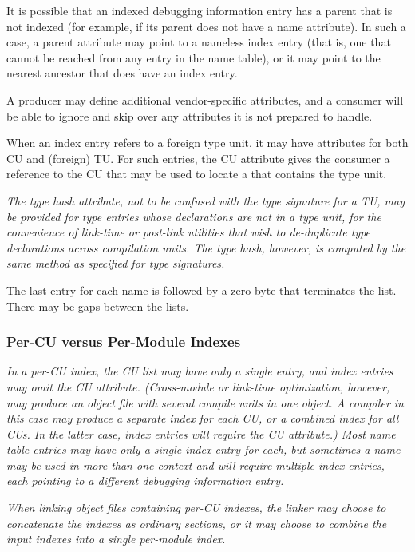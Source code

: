It is possible that an indexed debugging information entry
has a parent that is not
indexed (for example, if its parent does not have a name attribute). 
In such a case, a parent attribute may point to a nameless index
entry (that is, one that cannot be reached from any entry in the
name table), or it may point to the nearest ancestor that does
have an index entry.

A producer may define additional vendor-specific attributes, 
and a consumer will be able to ignore and skip over any attributes 
it is not prepared to handle.

When an index entry refers to a foreign type unit, it may have
attributes for both CU and (foreign) TU. For such entries, the CU
attribute gives the consumer a reference to the CU that may be used to
locate a \splitDWARFobjectfile{} that contains the type unit.

\textit{The type hash attribute, not to be confused with the type signature
for a TU, may be provided for type entries whose declarations are not
in a type unit, for the convenience of link-time or post-link
utilities that wish to de-duplicate type declarations across
compilation units. The type hash, however, is computed by the
same method as specified for type signatures.}

The last entry for each name is followed by a zero byte that
terminates the list. There may be gaps between the lists.

\subsubsection{Per-CU versus Per-Module Indexes}
\label{chap:percuvspermoduleindexes}
\textit{In a per-CU index, the CU list may have only a single entry, 
and index entries may omit the CU attribute. (Cross-module or link-time
optimization, however, may produce an object file with several compile
units in one object. A compiler in this case may produce a separate
index for each CU, or a combined index for all CUs. In the latter
case, index entries will require the CU attribute.) Most name table
entries may have only a single index entry for each, but sometimes a
name may be used in more than one context and will require multiple
index entries, each pointing to a different debugging information
entry.}

\textit{When linking object files containing per-CU indexes, the 
linker may choose to concatenate the indexes as ordinary sections, 
or it may choose to combine the input indexes into a single 
per-module index.}


